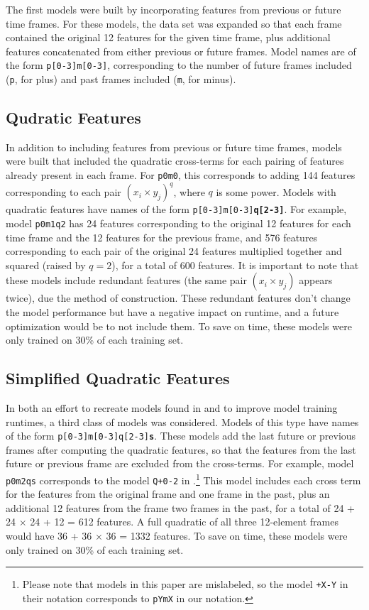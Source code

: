 The first models were built by incorporating features from previous or future
time frames. For these models, the data set was expanded so that each frame
contained the original 12 features for the given time frame, plus additional
features concatenated from either previous or future frames. Model names are of
the form \texttt{p[0-3]m[0-3]}, corresponding to the number of future frames
included (\texttt{p}, for plus) and past frames included (\texttt{m}, for
minus).

\subsection{Qudratic Features}

In addition to including features from previous or future time frames, models
were built that included the quadratic cross-terms for each pairing of features
already present in each frame. For \texttt{p0m0}, this corresponds to adding
144 features corresponding to each pair $(x_{i} \times y_{j})^{q}$, where $q$
is some power. Models with quadratic features have names of the form
\texttt{p[0-3]m[0-3]\textbf{q[2-3]}}. For example, model \texttt{p0m1q2} has 24
features corresponding to the original 12 features for each time frame and the
12 features for the previous frame, and 576 features corresponding to each pair
of the original 24 features multiplied together and squared (raised by $q =
2$), for a total of 600 features. It is important to note that these models
include redundant features (the same pair $(x_{i} \times y_{j})$  appears
twice), due the method of construction. These redundant features don't change
the model performance but have a negative impact on runtime, and a future
optimization would be to not include them. To save on time, these models were
only trained on 30\% of each training set.

\subsection{Simplified Quadratic Features}

In both an effort to recreate models found in
\cite{Weller_structuredprediction} and to improve model training runtimes, a
third class of models was considered.  Models of this type have names of the
form \texttt{p[0-3]m[0-3]q[2-3]\textbf{s}}. These models add the last future or
previous frames after computing the quadratic features, so that the features
from the last future or previous frame are excluded from the cross-terms. For
example, model \texttt{p0m2qs} corresponds to the model \texttt{Q+0-2} in
\cite{Weller_structuredprediction}.\footnote{Please note that models in this
paper are mislabeled, so the model \texttt{+X-Y} in their notation corresponds
to \texttt{pYmX} in our notation.} This model includes each cross term for the
features from the original frame and one frame in the past, plus an additional
12 features from the frame two frames in the past, for a total of 24 + 24
$\times$ 24 + 12 = 612 features. A full quadratic of all three 12-element
frames would have 36 + 36 $\times$ 36 = 1332 features. To save on time, these
models were only trained on 30\% of each training set.

